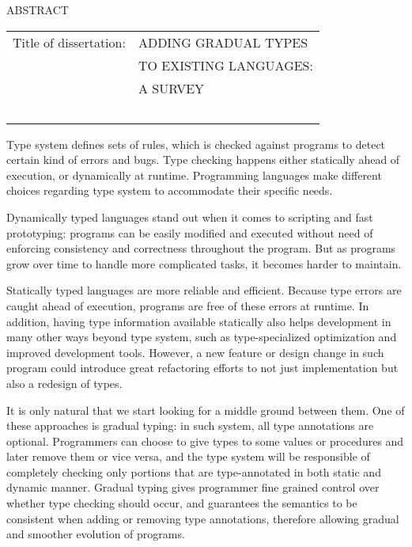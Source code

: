 \renewcommand{\baselinestretch}{1}
\small \normalsize

\begin{center}
\large{{ABSTRACT}}

\vspace{3em}

\end{center}
\hspace{-.15in}


\vspace{3em}
\begin{tabular}{ll}
	Title of dissertation:    & {\large  ADDING GRADUAL TYPES }\\
	&                     {\large  TO EXISTING LANGUAGES:} \\
	&                     {\large  A SURVEY} \\
	\ \\
\end{tabular}

\renewcommand{\baselinestretch}{2}
\large \normalsize



Type system defines sets of rules, which is checked against programs to
detect certain kind of errors and bugs. Type checking happens either
statically ahead of execution, or dynamically at runtime.
Programming languages make different choices regarding type system to
accommodate their specific needs.

Dynamically typed languages stand out when it comes to scripting and fast prototyping:
programs can be easily modified and executed without need of enforcing consistency and correctness throughout the program.
But as programs grow over time to handle more complicated tasks,
it becomes harder to maintain.

Statically typed languages are more reliable and efficient.
Because type errors are caught ahead of execution,
programs are free of these errors at runtime.
In addition, having type information available statically also helps
development in many other ways beyond type system, such as
type-specialized optimization and improved development tools.
However, a new feature or design change in such program could introduce
great refactoring efforts to not just implementation but also a redesign
of types.

It is only natural that we start looking for a middle ground between them.
One of these approaches is gradual typing: in such system,
all type annotations are optional.
Programmers can choose to give types to some values or procedures and later remove them or vice versa, and the type system will be responsible of completely checking only portions
that are type-annotated in both static and dynamic manner.
Gradual typing gives programmer fine grained control over whether type checking should occur,
and guarantees the semantics to be consistent when adding or removing type annotations,
therefore allowing gradual and smoother evolution of programs.

